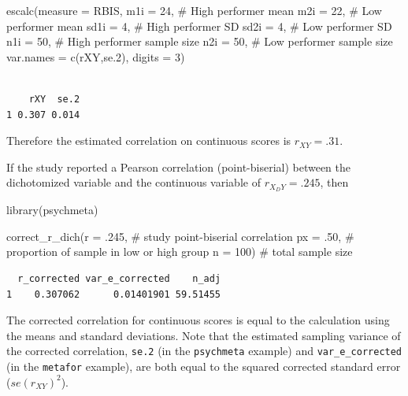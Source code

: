 \documentclass[
  letterpaper,
  DIV=11,
  numbers=noendperiod]{scrreprt}
\newenvironment{Shaded}{}{}
\newcommand{\AttributeTok}[1]{\textcolor[rgb]{0.00,0.34,0.68}{#1}}
\newcommand{\CommentTok}[1]{\textcolor[rgb]{0.54,0.53,0.53}{#1}}
\newcommand{\DecValTok}[1]{\textcolor[rgb]{0.69,0.50,0.00}{#1}}
\newcommand{\FunctionTok}[1]{\textcolor[rgb]{0.39,0.29,0.61}{#1}}
\newcommand{\NormalTok}[1]{\textcolor[rgb]{0.12,0.11,0.11}{#1}}
\newcommand{\StringTok}[1]{\textcolor[rgb]{0.75,0.01,0.01}{#1}}
\begin{document}
\begin{tcolorbox}
\begin{Shaded}
\begin{Highlighting}[]
\FunctionTok{escalc}\NormalTok{(}\AttributeTok{measure =} \StringTok{\textquotesingle{}RBIS\textquotesingle{}}\NormalTok{,}
       \AttributeTok{m1i =} \DecValTok{24}\NormalTok{, }\CommentTok{\# High performer mean }
       \AttributeTok{m2i =} \DecValTok{22}\NormalTok{, }\CommentTok{\# Low performer mean}
       \AttributeTok{sd1i =} \DecValTok{4}\NormalTok{, }\CommentTok{\# High performer SD}
       \AttributeTok{sd2i =} \DecValTok{4}\NormalTok{, }\CommentTok{\# Low performer SD}
       \AttributeTok{n1i =} \DecValTok{50}\NormalTok{, }\CommentTok{\# High performer sample size}
       \AttributeTok{n2i =} \DecValTok{50}\NormalTok{, }\CommentTok{\# Low performer sample size}
       \AttributeTok{var.names =} \FunctionTok{c}\NormalTok{(}\StringTok{\textquotesingle{}rXY\textquotesingle{}}\NormalTok{,}\StringTok{\textquotesingle{}se.2\textquotesingle{}}\NormalTok{),}
       \AttributeTok{digits =} \DecValTok{3}\NormalTok{)}
\end{Highlighting}
\end{Shaded}

\begin{verbatim}

    rXY  se.2 
1 0.307 0.014 
\end{verbatim}

Therefore the estimated correlation on continuous scores is
\(r_{XY}=.31\).

If the study reported a Pearson correlation (point-biserial) between the
dichotomized variable and the continuous variable of \(r_{X_D Y}=.245\),
then

\begin{Shaded}
\begin{Highlighting}[]
\FunctionTok{library}\NormalTok{(psychmeta)}

\FunctionTok{correct\_r\_dich}\NormalTok{(}\AttributeTok{r =}\NormalTok{ .}\DecValTok{245}\NormalTok{, }\CommentTok{\# study point{-}biserial correlation}
               \AttributeTok{px =}\NormalTok{ .}\DecValTok{50}\NormalTok{, }\CommentTok{\# proportion of sample in low or high group}
               \AttributeTok{n =} \DecValTok{100}\NormalTok{) }\CommentTok{\# total sample size}
\end{Highlighting}
\end{Shaded}

\begin{verbatim}
  r_corrected var_e_corrected    n_adj
1    0.307062      0.01401901 59.51455
\end{verbatim}

The corrected correlation for continuous scores is equal to the
calculation using the means and standard deviations. Note that the
estimated sampling variance of the corrected correlation, \texttt{se.2}
(in the \texttt{psychmeta} example) and \texttt{var\_e\_corrected} (in
the \texttt{metafor} example), are both equal to the squared corrected
standard error (\(se(r_{XY})^2\)).

\end{tcolorbox}
\end{document}
